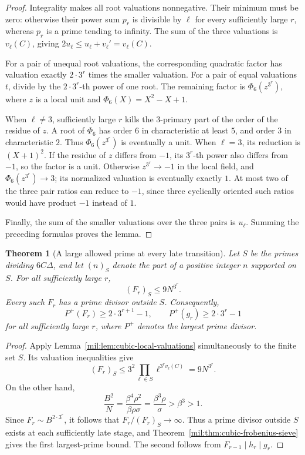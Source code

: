 \documentclass[11pt,a4paper]{article}
\newtheorem{theorem}{Theorem}[section]
\theoremstyle{definition}
\theoremstyle{remark}
\numberwithin{equation}{section}
\begin{document}
\begin{proof}
Integrality makes all root valuations nonnegative.  Their minimum must
be zero: otherwise their power sum $p_r$ is divisible by $\ell$ for every
sufficiently large $r$, whereas $p_r$ is a prime tending to infinity.
The sum of the three valuations is $v_\ell(C)$, giving
$2u_\ell\leq u_\ell+v_\ell'=v_\ell(C)$.

For a pair of unequal root valuations, the corresponding quadratic factor
has valuation exactly $2\cdot3^r$ times the smaller valuation.
For a pair of equal valuations $t$, divide by the $2\cdot3^r$-th power of
one root.  The remaining factor is
$\Phi_6(z^{3^r})$, where $z$ is a local unit and
$\Phi_6(X)=X^2-X+1$.

When $\ell\ne3$, sufficiently large $r$ kills the $3$-primary part of the
order of the residue of $z$.  A root of $\Phi_6$ has order $6$ in
characteristic at least $5$, and order $3$ in characteristic $2$.
Thus $\Phi_6(z^{3^r})$ is eventually a unit.
When $\ell=3$, its reduction is $(X+1)^2$.
If the residue of $z$ differs from $-1$, its $3^r$-th power also differs
from $-1$, so the factor is a unit.  Otherwise $z^{3^r}\to-1$ in the local
field, and $\Phi_6(z^{3^r})\to3$; its normalized valuation is eventually
exactly $1$.
At most two of the three pair ratios can reduce to $-1$, since three
cyclically oriented such ratios would have product $-1$ instead of $1$.

Finally, the sum of the smaller valuations over the three pairs is
$u_\ell$.  Summing the preceding formulas proves the lemma.
\end{proof}

\begin{theorem}[A large allowed prime at every late transition]
\label{mil:thm:cubic-large-primes}
Let $S$ be the primes dividing $6C\Delta$, and let $(n)_S$ denote the part
of a positive integer $n$ supported on $S$.  For all sufficiently large $r$,
\[
 (F_r)_S\leq9N^{3^r}.
\]
Every such $F_r$ has a prime divisor outside $S$.  Consequently,
\[
 P^+(F_r)\geq2\cdot3^{r+1}-1,
 \qquad P^+(g_r)\geq2\cdot3^r-1
\]
for all sufficiently large $r$, where $P^+$ denotes the largest prime
divisor.
\end{theorem}

\begin{proof}
Apply Lemma~\ref{mil:lem:cubic-local-valuations} simultaneously to the finite
set $S$.  Its valuation inequalities give
\[
 (F_r)_S\leq3^2\prod_{\ell\in S}
       \ell^{3^r v_\ell(C)}=9N^{3^r}.
\]
On the other hand,
\[
 \frac{B^2}{N}
 =\frac{\beta^4\rho^2}{\beta\rho\sigma}
 =\frac{\beta^3\rho}{\sigma}>\beta^3>1.
\]
Since $F_r\sim B^{2\cdot3^r}$, it follows that
$F_r/(F_r)_S\to\infty$.  Thus a prime divisor outside $S$ exists at each
sufficiently late stage, and Theorem~\ref{mil:thm:cubic-frobenius-sieve} gives
the first largest-prime bound.  The second follows from
$F_{r-1}\mid h_r\mid g_r$.
\end{proof}
\end{document}
